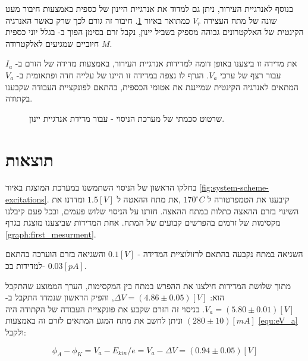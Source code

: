 \documentclass{article}
\newcommand*\circled[1]{\tikz[baseline=(char.base)]{
		            \node[shape=circle,draw,inner sep=1pt] (char) {#1};}}
\begin{document}
בנוסף לאנרגיית העירור, ניתן גם למדוד את אנרגיית היינון של כספית באמצעות חיבור מעט שונה של מתח העצירה
$V_r$
כמתואר באיור
\ref{fig:system-scheme-ionization}.
חיבור זה גורם לכך שרק כאשר האנרגיה הקינטית של האלקטרונים גבוהה מספיק בשביל יינון,
נקבל זרם בסימן הפוך ב-
\circled{pA}
בגלל יוני כספית חיוביים שמגיעים לאלקטרודה
$M$.

את מדידה זו ביצענו באופן דומה למדידות אנרגיית העירור, באמצעות מדידה של הזרם ב-
$I_a$
עבור רצף של ערכי
$V_a$.
הגרף לו נצפה במדידה זו היינו של עלייה חדה ופתאומית ב-
$V_a$
המתאים לאנרגיה הקינטית שמייננת את אטומי הכספית, בהתאם לפונקציית העבודה שקבענו בקתודה.

\begin{figure}
   \centering
   \caption{
   שרטוט סכמתי של מערכת הניסוי - עבור מדידת אנרגיית יינון.
   }
   \label{fig:system-scheme-ionization}
\end{figure}

\clearpage

\section{תוצאות}
בחלקו הראשון של הניסוי השתמשנו במערכת המוצגת באיור
\ref{fig:system-scheme-excitations}.
קיבענו את הטמפרטורה ל
$170 ^{\circ} C$
,את מתח ההאטה ל
$1.5 [V]$
ומדדנו את השינוי בזרם ההאצה כתלות במתח ההאצה.
חזרנו על הניסוי שלוש פעמים, ובכל פעם קיבלנו מקסימות של זרמים בהפרשים קבועים של המתח.
אחת המדידות שביצענו מוצגת בגרף
\ref{graph:first_mesurment}.
 
\begin{graph}[H]
	\begin{center}
	\resizebox{\textwidth}{!}{}
	\end{center}
	\caption{תוצאות הניסוי פרנק הרץ}
\label{graph:first_mesurment}
\end{graph}

השגיאה במתח נקבעה בהתאם לרזולוציית המדידה - 
$0.1 [V]$
והשגיאה בזרם הוערכה בהתאם למדידות בכ- 
$0.03 [pA]$.

מתוך שלושת המדידות חילצנו את ההפרש במתח בין המקסימות, הערך הממוצע שהתקבל הוא:
$\Delta V = (4.86 \pm 0.05)[V]$,
והפיק הראשון שנמדד התקבל ב- 
$V_a = (5.80 \pm 0.01)[V]$.
בניסוי זה הזרם שקבע את פונקציית העבודה של הקתודה היה
$(280 \pm 10) [mA]$
וניתן לחשב את מתח המגע המתאים לזרם זה באמצעות
\ref{equ:eV_a}
ולקבל:

$$ \phi_A - \phi_K = V_a - E_{kin}/e = V_a - \Delta V = (0.94 \pm 0.05) [V]$$ 
\end{document}

